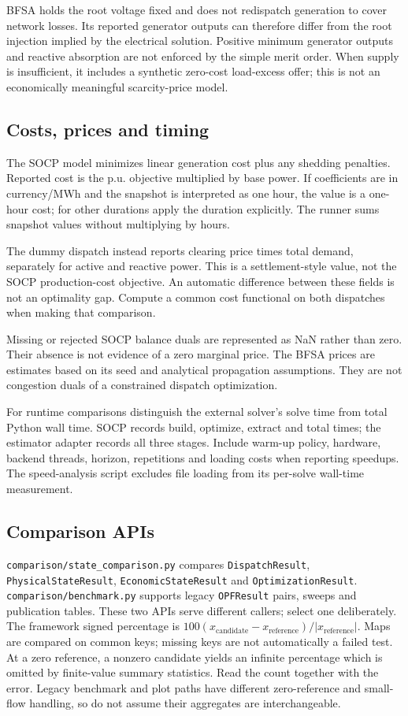 \documentclass[11pt,a4paper]{article}
\newcommand{\code}[1]{\nolinkurl{#1}}
\begin{document}
BFSA holds the root voltage fixed and does not redispatch generation to cover
network losses. Its reported generator outputs can therefore differ from the
root injection implied by the electrical solution. Positive minimum generator
outputs and reactive absorption are not enforced by the simple merit order.
When supply is insufficient, it includes a synthetic zero-cost load-excess
offer; this is not an economically meaningful scarcity-price model.

\subsection{Costs, prices and timing}
The SOCP model minimizes linear generation cost plus any shedding penalties.
Reported cost is the p.u. objective multiplied by base power. If coefficients
are in currency/MWh and the snapshot is interpreted as one hour, the value
is a one-hour cost; for other durations apply the duration explicitly.
The runner sums snapshot values without multiplying by hours.

The dummy dispatch instead reports clearing price times total demand,
separately for active and reactive power. This is a settlement-style value,
not the SOCP production-cost objective. An automatic difference between these
fields is not an optimality gap. Compute a common cost functional on both
dispatches when making that comparison.

Missing or rejected SOCP balance duals are represented as NaN rather than
zero. Their absence is not evidence of a zero marginal price. The BFSA prices
are estimates based on its seed and analytical propagation assumptions.
They are not congestion duals of a constrained dispatch optimization.

For runtime comparisons distinguish the external solver's solve time from
total Python wall time. SOCP records build, optimize, extract and total times;
the estimator adapter records all three stages. Include warm-up policy,
hardware, backend threads, horizon, repetitions and loading costs when
reporting speedups. The speed-analysis script excludes file loading from its
per-solve wall-time measurement.

\subsection{Comparison APIs}
\code{comparison/state_comparison.py} compares \code{DispatchResult},
\code{PhysicalStateResult}, \code{EconomicStateResult} and
\code{OptimizationResult}. \code{comparison/benchmark.py} supports legacy
\code{OPFResult} pairs, sweeps and publication tables. These two APIs serve
different callers; select one deliberately.
The framework signed percentage is
\(100(x_{\mathrm{candidate}}-x_{\mathrm{reference}})/|x_{\mathrm{reference}}|\).
Maps are compared on common keys; missing keys are not automatically a failed
test. At a zero reference, a nonzero candidate yields an infinite percentage
which is omitted by finite-value summary statistics. Read the count together
with the error. Legacy benchmark and plot paths have different zero-reference
and small-flow handling, so do not assume their aggregates are interchangeable.
\end{document}

